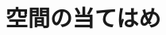 \documentclass[../../topic_linear-algebra]{subfiles}
\begin{document}
\chapter{空間の当てはめ}\label{ch:fitting-space}
\end{document}
